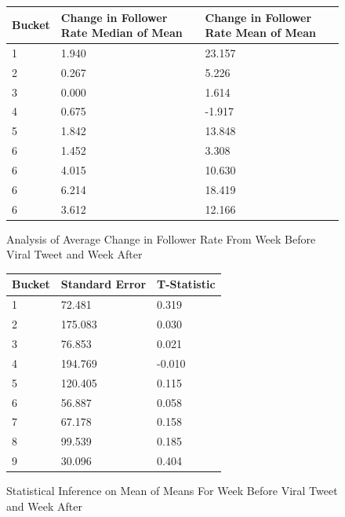 \documentclass[twoside,twocolumn]{article}
\begin{document}
\begin{center}
\begin{figure}[H]
\begin{tabular}{ | m{1.5cm} | m{2cm} |m{2cm} | } 
  \hline
    Bucket  & Change in Follower Rate Median of Mean & Change in Follower Rate Mean of Mean \\ 
  \hline
  1 & 1.940 & 23.157  \\ 
  \hline
  2 & 0.267 & 5.226  \\  
  \hline
  3 & 0.000 & 1.614  \\ 
  \hline
  4 & 0.675 & -1.917  \\  
  \hline
  5 & 1.842 & 13.848  \\ 
  \hline
  6 & 1.452 & 3.308  \\  
  \hline
  6 & 4.015 & 10.630  \\  
  \hline
  6 & 6.214 & 18.419  \\  
  \hline
  6 & 3.612 & 12.166 \\  
  \hline
\end{tabular}
\caption{Analysis of Average Change in Follower Rate From Week Before Viral Tweet and Week After}
\end{figure}


\begin{figure}[H]
\begin{tabular}{ | m{1.5cm} | m{2cm} |m{2cm} | } 
  \hline
    Bucket  &  Standard Error & T-Statistic\\ 
  \hline
  1 & 72.481 & 0.319  \\ 
  \hline
  2 & 175.083 & 0.030  \\  
  \hline
  3 & 76.853 & 0.021  \\ 
  \hline
  4 & 194.769 & -0.010  \\  
  \hline
  5 & 120.405 & 0.115  \\ 
  \hline
  6 & 56.887 & 0.058  \\  
  \hline
  7 & 67.178 & 0.158  \\ 
  \hline
  8 & 99.539 & 0.185  \\  
  \hline
  9 & 30.096 & 0.404  \\  
  \hline
\end{tabular}
\caption{Statistical Inference on Mean of Means For Week Before Viral Tweet and Week After}
\end{figure}



\end{center}
\end{document}
